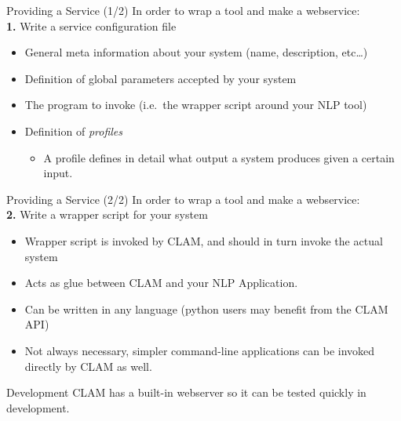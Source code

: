 \documentclass[xcolor=table,10pt,t]{beamer}
\begin{document}
\begin{frame}
    \begin{block}{Providing a Service (1/2)}
        In order to wrap a tool and make a webservice: \\
        \textbf{1.} Write a service configuration file
        \begin{itemize}
            \item General meta information about your system
                {\footnotesize{(name, description, etc\ldots)}}
            \item Definition of global parameters accepted by your system
            \item The program to invoke {\footnotesize{(i.e.\ the wrapper script around your NLP tool)}}
            \item Definition of \emph{profiles}
            \begin{itemize}
                \item A profile defines in detail what output a system produces given a certain input.
            \end{itemize}
        \end{itemize}

    \end{block}

\end{frame}

\begin{frame}
    \begin{block}{Providing a Service (2/2)}
        In order to wrap a tool and make a webservice: \\
        \textbf{2.} Write a wrapper script for your system
        \begin{itemize}
            \item Wrapper script is invoked by CLAM, and should in turn invoke the actual system
            \item Acts as glue between CLAM and your NLP Application.
            \item Can be written in any language (python users may benefit from the CLAM API)
            \item Not always necessary, simpler command-line applications can be invoked directly by CLAM as well.
        \end{itemize}
    \end{block}

    \begin{block}{Development}
        CLAM has a built-in webserver so it can be tested quickly in
        development.
    \end{block}

\end{frame}
\end{document}
